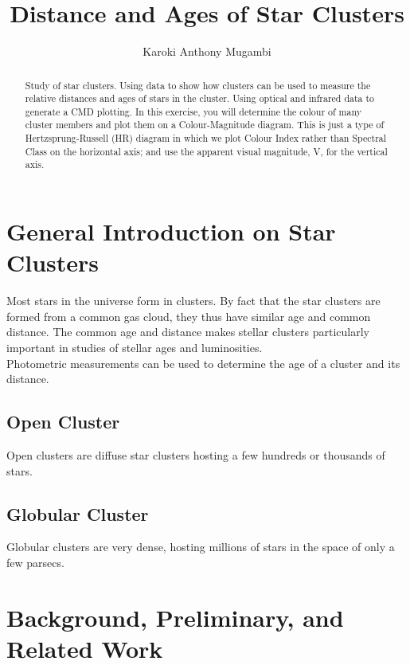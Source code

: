 \documentclass[12pt, twocolumn]{article}
\title{Distance and Ages of Star Clusters}
\author{Karoki Anthony Mugambi}
\date{}
\begin{document}
	\onecolumn
	\maketitle
	\begin{abstract}
		Study of star clusters. Using data to show how clusters can be used to measure the relative distances and ages of stars in the cluster. Using optical and infrared data to generate a CMD plotting. In this exercise, you will determine the colour of many cluster members and plot them on a Colour-Magnitude diagram. This is just a type of Hertzsprung-Russell (HR) diagram in which we plot Colour Index rather than Spectral Class on the horizontal axis; and use the apparent visual magnitude, V, for the vertical axis.
	\end{abstract}
	
	\tableofcontents
	
	
	
	\pagebreak
	\section{General Introduction on Star Clusters}
	\label{introduction}
	Most stars in the universe form in clusters. By fact that the star clusters are formed from a common gas cloud, they thus have similar age and common distance. The common age and distance makes stellar clusters particularly important in studies of stellar ages and luminosities.\\
	Photometric measurements can be used to determine the age of a cluster and its distance.
	
		\subsection{Open Cluster}
		Open clusters are diffuse star clusters hosting a few hundreds or thousands of stars.
		
		 
		\subsection{Globular Cluster}
		Globular clusters are very dense, hosting millions of stars in the space of only a few parsecs.
	
	
	\section{Background, Preliminary, and Related Work}
	
\end{document}

